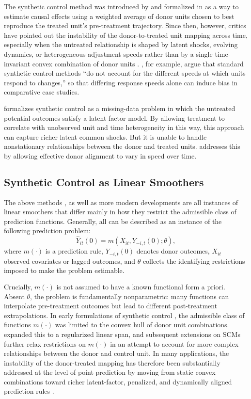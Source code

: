 \documentclass{article}
\begin{document}
The synthetic control method was introduced by \citet{abadie_economic_2003} and formalized in \cite{abadie_synthetic_2010} as a way to estimate causal effects using a weighted average of donor units chosen to best reproduce the treated unit’s pre-treatment trajectory. Since then, however, critics have pointed out the instability of the donor-to-treated unit mapping across time, especially when the untreated relationship is shaped by latent shocks, evolving dynamics, or heterogeneous adjustment speeds rather than by a single time-invariant convex combination of donor units \citep{xu_generalized_2017, Ferman2021, Cao2025}. \citet{Cao2025}, for example, argue that standard synthetic control methods “do not account for the different speeds at which units respond to changes,” so that differing response speeds alone can induce bias in comparative case studies. \citep{Cao2025}

\citet{xu_generalized_2017} formalizes synthetic control as a missing-data problem in which the untreated potential outcomes satisfy a latent factor model. By allowing treatment to correlate with unobserved unit and time heterogeneity in this way, this approach can capture richer latent common shocks. But it is unable to handle nonstationary relationships between the donor and treated units. \citet{Cao2025} addresses this by allowing effective donor alignment to vary in speed over time.

\subsection{Synthetic Control as Linear Smoothers}

The above methods \citep{xu_generalized_2017,Abadie2003,Abadie2010}, as well as more modern developments \citep{AbadieLHour2021, Cao2025,Shao2022} are all instances of linear smoothers that differ mainly in how they restrict the admissible class of prediction functions. Generally, all can be described as an instance of the following prediction problem:
\[
\hat Y_{it}(0)
=
m(X_{it}, Y_{-i,t}(0);\theta),
\]
where $m(\cdot)$ is a prediction rule, $Y_{-i,t}(0)$ denotes donor outcomes, $X_{it}$ observed covariates or lagged outcomes, and $\theta$ collects the identifying restrictions imposed to make the problem estimable.

Crucially, $m(\cdot)$ is not assumed to have a known functional form a priori. Absent $\theta$, the problem is fundamentally nonparametric: many functions can interpolate pre-treatment outcomes but lead to different post-treatment extrapolations. In early formulations of synthetic control \citep{Abadie2003,Abadie2010}, the admissible class of functions $m(\cdot)$ was limited to the convex hull of donor unit combinations. \citet{AbadieLHour2021} expanded this to a regularized linear span, and subsequent extensions on SCMs further relax restrictions on $m(\cdot)$ in an attempt to account for more complex relationships between the donor and control unit. In many applications, the instability of the donor-treated mapping has therefore been substantially addressed at the level of point prediction by moving from static convex combinations toward richer latent-factor, penalized, and dynamically aligned prediction rules \citep{xu_generalized_2017,AbadieLHour2021,Cao2025}.
\end{document}
